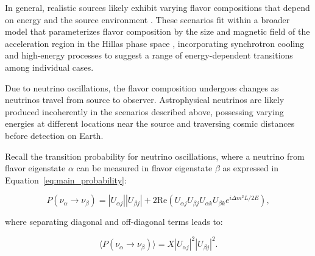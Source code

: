 In general, realistic sources likely exhibit varying flavor compositions that depend on energy and the source environment . These scenarios fit within a broader model that parameterizes flavor composition by the size and magnetic field of the acceleration region in the Hillas phase space , incorporating synchrotron cooling and high-energy processes to suggest a range of energy-dependent transitions among individual cases.

Due to neutrino oscillations, the flavor composition undergoes changes as neutrinos travel from source to observer. Astrophysical neutrinos are likely produced incoherently in the scenarios described above, possessing varying energies at different locations near the source and traversing cosmic distances before detection on Earth.

Recall the transition probability for neutrino oscillations, where a neutrino from flavor eigenstate $\alpha$ can be measured in flavor eigenstate $\beta$ as expressed in Equation~\ref{eq:main_probability}:

\[
P(\nu_\alpha \to \nu_\beta) = |U_{\alpha j}| |U_{\beta j}| + 2 \text{Re}(U_{\alpha j} U_{\beta j} U_{\alpha k} U_{\beta k} e^{i \Delta m^2 L / 2E}),
\]

where separating diagonal and off-diagonal terms leads to:

\[
\langle P(\nu_\alpha \to \nu_\beta) \rangle = X |U_{\alpha j}|^2 |U_{\beta j}|^2.
\]

